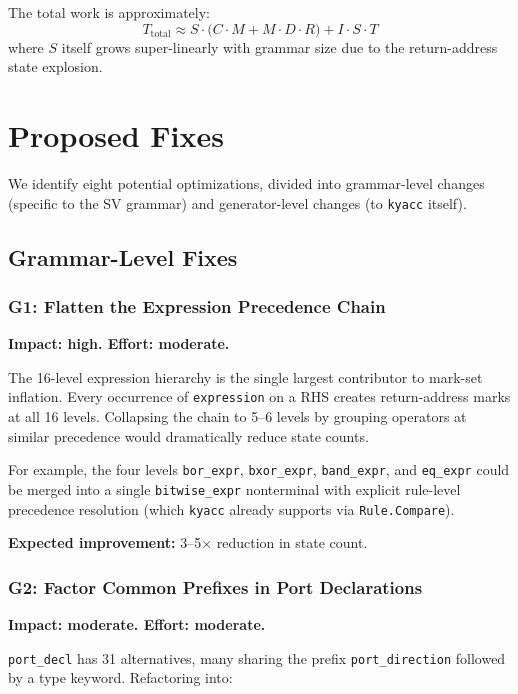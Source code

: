 \documentclass[11pt]{article}
\begin{document}
The total work is approximately:
\[
T_{\text{total}} \approx S \cdot \bigl( C \cdot M + M \cdot D \cdot R \bigr)
  + I \cdot S \cdot T
\]
where $S$ itself grows super-linearly with grammar size due to
the return-address state explosion.

\section{Proposed Fixes}

We identify eight potential optimizations, divided into grammar-level
changes (specific to the SV grammar) and generator-level changes
(to \texttt{kyacc} itself).

\subsection{Grammar-Level Fixes}

\subsubsection{G1: Flatten the Expression Precedence Chain}

\textbf{Impact: high. \quad Effort: moderate.}

The 16-level expression hierarchy is the single largest contributor to
mark-set inflation.  Every occurrence of \texttt{expression} on a
RHS creates return-address marks at all 16 levels.  Collapsing the
chain to 5--6 levels by grouping operators at similar precedence would
dramatically reduce state counts.

For example, the four levels \texttt{bor\_expr}, \texttt{bxor\_expr},
\texttt{band\_expr}, and \texttt{eq\_expr} could be merged into a
single \texttt{bitwise\_expr} nonterminal with explicit rule-level
precedence resolution (which \texttt{kyacc} already supports via
\texttt{Rule.Compare}).

\textbf{Expected improvement:} 3--5$\times$ reduction in state count.

\subsubsection{G2: Factor Common Prefixes in Port Declarations}

\textbf{Impact: moderate. \quad Effort: moderate.}

\texttt{port\_decl} has 31 alternatives, many sharing the prefix
\texttt{port\_direction} followed by a type keyword.  Refactoring into:
\end{document}
